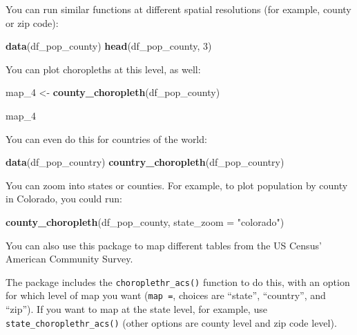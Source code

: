 \documentclass[]{book}
\makeatletter
\newenvironment{Shaded}{\begin{snugshade}}{\end{snugshade}}
\newcommand{\KeywordTok}[1]{\textcolor[rgb]{0.13,0.29,0.53}{\textbf{#1}}}
\newcommand{\DataTypeTok}[1]{\textcolor[rgb]{0.13,0.29,0.53}{#1}}
\newcommand{\DecValTok}[1]{\textcolor[rgb]{0.00,0.00,0.81}{#1}}
\newcommand{\StringTok}[1]{\textcolor[rgb]{0.31,0.60,0.02}{#1}}
\newcommand{\NormalTok}[1]{#1}
\newenvironment{kframe}{%
\medskip{}
\setlength{\fboxsep}{.8em}
 \def\at@end@of@kframe{}%
 \ifinner\ifhmode%
  \def\at@end@of@kframe{\end{minipage}}%
  \begin{minipage}{\columnwidth}%
 \fi\fi%
 \def\FrameCommand##1{\hskip\@totalleftmargin \hskip-\fboxsep
 \colorbox{shadecolor}{##1}\hskip-\fboxsep
     \hskip-\linewidth \hskip-\@totalleftmargin \hskip\columnwidth}%
 \MakeFramed {\advance\hsize-\width
   \@totalleftmargin\z@ \linewidth\hsize
   \@setminipage}}%
 {\par\unskip\endMakeFramed%
 \at@end@of@kframe}
\renewenvironment{Shaded}{\begin{kframe}}{\end{kframe}}
\theoremstyle{definition}
\theoremstyle{definition}
\theoremstyle{definition}
\theoremstyle{remark}
\makeatother
\begin{document}
You can run similar functions at different spatial resolutions (for
example, county or zip code):

\begin{Shaded}
\begin{Highlighting}[]
\KeywordTok{data}\NormalTok{(df_pop_county)}
\KeywordTok{head}\NormalTok{(df_pop_county, }\DecValTok{3}\NormalTok{)}
\end{Highlighting}
\end{Shaded}

You can plot choropleths at this level, as well:

\begin{Shaded}
\begin{Highlighting}[]
\NormalTok{map_}\DecValTok{4}\NormalTok{ <-}\StringTok{ }\KeywordTok{county_choropleth}\NormalTok{(df_pop_county)}
\end{Highlighting}
\end{Shaded}

\begin{Shaded}
\begin{Highlighting}[]
\NormalTok{map_}\DecValTok{4}
\end{Highlighting}
\end{Shaded}

You can even do this for countries of the world:

\begin{Shaded}
\begin{Highlighting}[]
\KeywordTok{data}\NormalTok{(df_pop_country)}
\KeywordTok{country_choropleth}\NormalTok{(df_pop_country)}
\end{Highlighting}
\end{Shaded}

You can zoom into states or counties. For example, to plot population by
county in Colorado, you could run:

\begin{Shaded}
\begin{Highlighting}[]
\KeywordTok{county_choropleth}\NormalTok{(df_pop_county, }\DataTypeTok{state_zoom =} \StringTok{"colorado"}\NormalTok{)}
\end{Highlighting}
\end{Shaded}

You can also use this package to map different tables from the US
Census' American Community Survey.

The package includes the \texttt{choroplethr\_acs()} function to do
this, with an option for which level of map you want (\texttt{map\ =},
choices are ``state'', ``country'', and ``zip''). If you want to map at
the state level, for example, use \texttt{state\_choroplethr\_acs()}
(other options are county level and zip code level).
\end{document}
